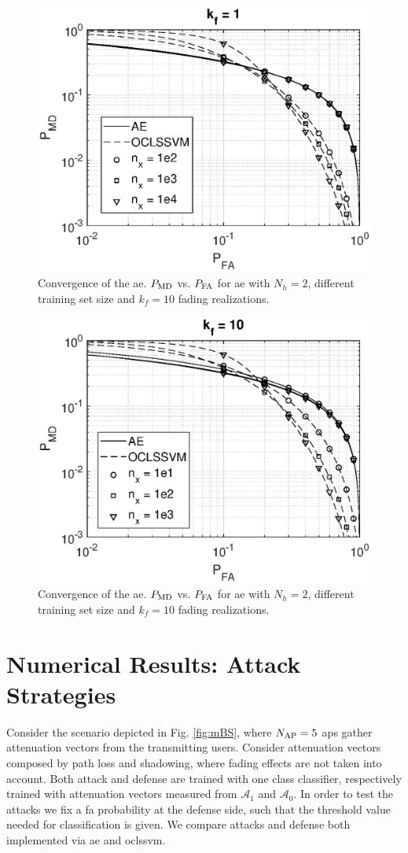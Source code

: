 \documentclass[draftcls,onecolumn,12pt]{IEEEtran}
\begin{document}
\begin{figure}[t]
    \centering
    \includegraphics[width=0.5\columnwidth]{res_avgnTrain_oneClass_kf1.eps}
    \caption{Convergence of the \ac{ae}. $P_{\rm MD}$ vs. $P_{\rm FA}$ for \ac{ae} with $N_h = 2$, different training set size and $k_f=10$ fading realizations.}
    \label{fig:kf1Oc}
\end{figure}

\begin{figure}[t]
    \centering
    \includegraphics[width=0.5\columnwidth]{res_avgnTrain_oneClass_kf10.eps}
    \caption{Convergence of the \ac{ae}. $P_{\rm MD}$ vs. $P_{\rm FA}$ for \ac{ae} with $N_h = 2$, different training set size and $k_f=10$ fading realizations.}
    \label{fig:kf10Oc}
\end{figure}

\section{Numerical Results: Attack Strategies}
Consider the scenario depicted in Fig. \ref{fig:mBS}, where $N_{\rm AP}=5$ \acp{ap} gather attenuation vectors from the transmitting users. Consider attenuation vectors composed by path loss and shadowing, where fading effects are not taken into account. Both attack and defense are trained with one class classifier, respectively trained with attenuation vectors measured from $\mathcal{A}_1$ and $\mathcal{A}_0$. In order to test the attacks we fix a \ac{fa} probability at the defense side, such that the threshold value needed for classification is given. We compare attacks and defense both implemented via \ac{ae} and \ac{oclssvm}. 
\end{document}
